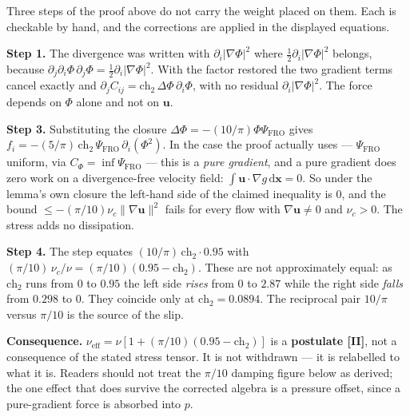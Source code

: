 \begin{remark}
\label{rem:nu-eff-postulate-2026-10-03}
Three steps of the proof above do not carry the weight placed on them. Each is
checkable by hand, and the corrections are applied in the displayed equations.

\textbf{Step 1.} The divergence was written with $\partial_i|\nabla\Phi|^2$ where
$\tfrac{1}{2}\partial_i|\nabla\Phi|^2$ belongs, because
$\partial_j\partial_i\Phi\,\partial_j\Phi = \tfrac{1}{2}\partial_i|\nabla\Phi|^2$.
With the factor restored the two gradient terms cancel exactly and
$\partial_j C_{ij} = \text{ch}_2\,\Delta\Phi\,\partial_i\Phi$, with no residual
$\partial_i|\nabla\Phi|^2$. The force depends on $\Phi$ alone and not on
$\mathbf{u}$.

\textbf{Step 3.} Substituting the closure $\Delta\Phi = -(10/\pi)\Phi\Psi_{\text{FRO}}$
gives $f_i = -(5/\pi)\,\text{ch}_2\,\Psi_{\text{FRO}}\,\partial_i(\Phi^2)$. In the
case the proof actually uses --- $\Psi_{\text{FRO}}$ uniform, via
$C_\Phi = \inf \Psi_{\text{FRO}}$ --- this is a \emph{pure gradient}, and a pure
gradient does zero work on a divergence-free velocity field:
$\int \mathbf{u}\cdot\nabla g \,\mathrm{d}\mathbf{x} = 0$. So under the lemma's own
closure the left-hand side of the claimed inequality is $0$, and the bound
$\leq -(\pi/10)\nu_c\|\nabla\mathbf{u}\|^2$ fails for every flow with
$\nabla\mathbf{u} \neq 0$ and $\nu_c > 0$. The stress adds no dissipation.

\textbf{Step 4.} The step equates $(10/\pi)\,\text{ch}_2 \cdot 0.95$ with
$(\pi/10)\,\nu_c/\nu = (\pi/10)(0.95 - \text{ch}_2)$. These are not
approximately equal: as $\text{ch}_2$ runs from $0$ to $0.95$ the left side
\emph{rises} from $0$ to $2.87$ while the right side \emph{falls} from $0.298$ to
$0$. They coincide only at $\text{ch}_2 = 0.0894$. The reciprocal pair
$10/\pi$ versus $\pi/10$ is the source of the slip.

\textbf{Consequence.} $\nu_{\text{eff}} = \nu[1 + (\pi/10)(0.95 - \text{ch}_2)]$ is
a \textbf{postulate [II]}, not a consequence of the stated stress tensor. It is
not withdrawn --- it is relabelled to what it is. Readers should not treat the
$\pi/10$ damping figure below as derived; the one effect that does survive the
corrected algebra is a pressure offset, since a pure-gradient force is absorbed
into $p$.
\end{remark}

